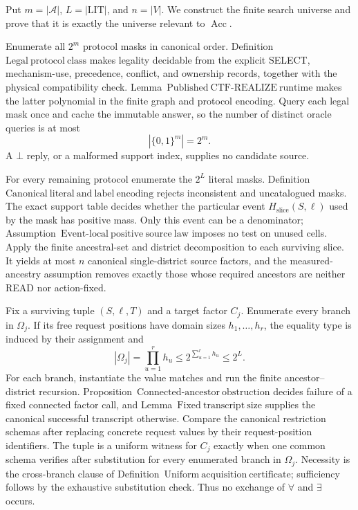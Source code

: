 Put \(m=|\mathcal A|\), \(L=|\mathrm{LIT}|\), and \(n=|V|\).  We construct the finite search universe and prove that it is exactly the universe relevant to \(\operatorname{Acc}\).

Enumerate all \(2^m\) protocol masks in canonical order.  Definition~\(\mathrm{Legal\ protocol\ class}\) makes legality decidable from the explicit SELECT, mechanism-use, precedence, conflict, and ownership records, together with the physical compatibility check.  Lemma~\(\mathrm{Published\ CTF\mbox{-}REALIZE\ runtime}\) makes the latter polynomial in the finite graph and protocol encoding.  Query each legal mask once and cache the immutable answer, so the number of distinct oracle queries is at most
\[
 |\{0,1\}^m|=2^m.
 \tag{45}
\]
A \(\bot\) reply, or a malformed support index, supplies no candidate source.

For every remaining protocol enumerate the \(2^L\) literal masks.  Definition~\(\mathrm{Canonical\ literal\ and\ label\ encoding}\) rejects inconsistent and uncatalogued masks.  The exact support table decides whether the particular event \(H_{\mathrm{slice}}(S,\ell)\) used by the mask has positive mass.  Only this event can be a denominator; Assumption~\(\mathrm{Event\mbox{-}local\ positive\ source\ law}\) imposes no test on unused cells.  Apply the finite ancestral-set and district decomposition to each surviving slice.  It yields at most \(n\) canonical single-district source factors, and the measured-ancestry assumption removes exactly those whose required ancestors are neither READ nor action-fixed.

Fix a surviving tuple \((S,\ell,T)\) and a target factor \(C_j\).  Enumerate every branch in \(\Omega_j\).  If its free request positions have domain sizes \(h_1,\ldots,h_r\), the equality type is induced by their assignment and
\[
 |\Omega_j|=\prod_{u=1}^{r}h_u
 \leq 2^{\sum_{u=1}^{r}h_u}
 \leq2^L.
 \tag{46}
\]
For each branch, instantiate the value matches and run the finite ancestor--district recursion.  Proposition~\(\mathrm{Connected\mbox{-}ancestor\ obstruction}\) decides failure of a fixed connected factor call, and Lemma~\(\mathrm{Fixed\ transcript\ size}\) supplies the canonical successful transcript otherwise.  Compare the canonical restriction schemas after replacing concrete request values by their request-position identifiers.  The tuple is a uniform witness for \(C_j\) exactly when one common schema verifies after substitution for every enumerated branch in \(\Omega_j\).  Necessity is the cross-branch clause of Definition~\(\mathrm{Uniform\ acquisition\ certificate}\); sufficiency follows by the exhaustive substitution check.  Thus no exchange of \(\forall\) and \(\exists\) occurs.

